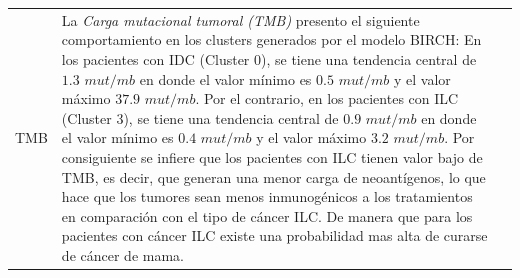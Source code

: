 \begin{table}
	\footnotesize
	\begin{threeparttable}
		\begin{tabular}{p{2.5cm} p{7cm} p{6.5cm}} \toprule
			TMB
			& La \textit{Carga mutacional tumoral (TMB)} presento el siguiente comportamiento en los clusters generados por el modelo BIRCH: En los pacientes con IDC (Cluster 0), se tiene una tendencia central de $1.3$ $mut/mb$ en donde el valor mínimo es $0.5$ $mut/mb$ y el valor máximo $37.9$ $mut/mb$. Por el contrario, en los pacientes con ILC (Cluster 3), se tiene una tendencia central de $0.9$ $mut/mb$ en donde el valor mínimo es $0.4$ $mut/mb$ y el valor máximo $3.2$ $mut/mb$. Por consiguiente se infiere que los pacientes con ILC tienen valor bajo de TMB, es decir, que generan una menor carga de neoantígenos, lo que hace que los tumores sean menos inmunogénicos a los tratamientos en comparación con el tipo de cáncer ILC. De manera que para los pacientes con cáncer ILC existe una probabilidad mas alta de curarse de cáncer de mama.  


\end{tabular}
\end{threeparttable}
\end{table}
